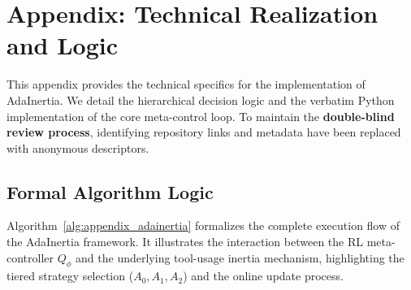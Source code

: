 \documentclass[runningheads]{llncs}
\begin{document}
\section{Appendix: Technical Realization and Logic}
\label{appendix:details}

This appendix provides the technical specifics for the implementation of AdaInertia. We detail the hierarchical decision logic and the verbatim Python implementation of the core meta-control loop. To maintain the \textbf{double-blind review process}, identifying repository links and metadata have been replaced with anonymous descriptors.

\subsection{Formal Algorithm Logic}
Algorithm~\ref{alg:appendix_adainertia} formalizes the complete execution flow of the AdaInertia framework. It illustrates the interaction between the RL meta-controller $Q_{\phi}$ and the underlying tool-usage inertia mechanism, highlighting the tiered strategy selection ($A_0, A_1, A_2$) and the online update process.
\end{document}
